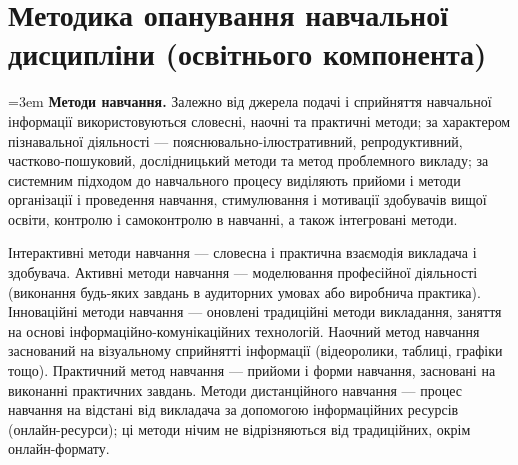 \documentclass{Syllabus}
\begin{document}
\printbibliography[category=Main, heading=subbibliography, title={Підручники та посібники}]

\printbibliography[category=Additional, heading=subbibliography, title={Додаткова}]

%



\section{Методика опанування навчальної дисципліни (освітнього компонента)}

\emergencystretch=3em
\textbf{Методи навчання.} Залежно від джерела подачі і сприйняття навчальної інформації використовуються словесні, наочні та практичні методи; за характером пізнавальної діяльності --- пояснювально-ілюстративний, репродуктивний, частково-пошуковий, дослідницький методи та метод проблемного викладу; за системним підходом до навчального процесу виділяють прийоми і методи організації і проведення навчання, стимулювання і мотивації здобувачів вищої освіти, контролю і самоконтролю в навчанні, а також інтегровані методи.

Інтерактивні методи навчання --- словесна і практична взаємодія викладача і здобувача. Активні методи навчання --- моделювання професійної діяльності (виконання будь-яких завдань в аудиторних умовах або виробнича практика). Інноваційні методи навчання --- оновлені традиційні методи викладання, заняття на основі інформаційно-комунікаційних технологій. Наочний метод навчання заснований на візуальному сприйнятті інформації (відеоролики, таблиці, графіки тощо). Практичний метод навчання --- прийоми і форми навчання, засновані на виконанні практичних завдань. Методи дистанційного навчання --- процес навчання на відстані від викладача за допомогою інформаційних ресурсів (онлайн-ресурси); ці методи нічим не відрізняються від традиційних, окрім онлайн-формату.
\end{document}
